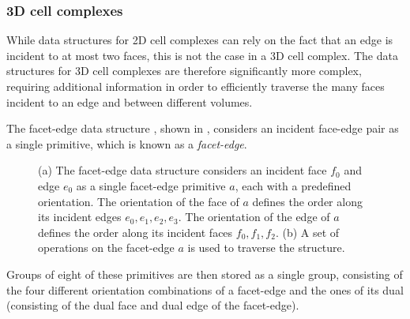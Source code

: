 \subsubsection{3D cell complexes}

While data structures for 2D cell complexes can rely on the fact that an edge is incident to at most two faces, this is not the case in a 3D cell complex.
The data structures for 3D cell complexes are therefore significantly more complex, requiring additional information in order to efficiently traverse the many faces incident to an edge and between different volumes.

The facet-edge data structure \citep{Dobkin87}, shown in , considers an incident face-edge pair as a single primitive, which is known as a \emph{facet-edge}.
\begin{figure}[tbp]
\centering
{}
\quad
{}
\caption[The facet-edge data structure]{(a) The facet-edge data structure considers an incident face $f_0$ and edge $e_0$ as a single facet-edge primitive $a$, each with a predefined orientation. The orientation of the face of $a$ defines the order along its incident edges $e_0,e_1,e_2,e_3$. The orientation of the edge of $a$ defines the order along its incident faces $f_0,f_1,f_2$. (b) A set of operations on the facet-edge $a$ is used to traverse the structure.}
\label{fig:facet-edge}
\end{figure}
Groups of eight of these primitives are then stored as a single group, consisting of the four different orientation combinations of a facet-edge and the ones of its dual (consisting of the dual face and dual edge of the facet-edge).

